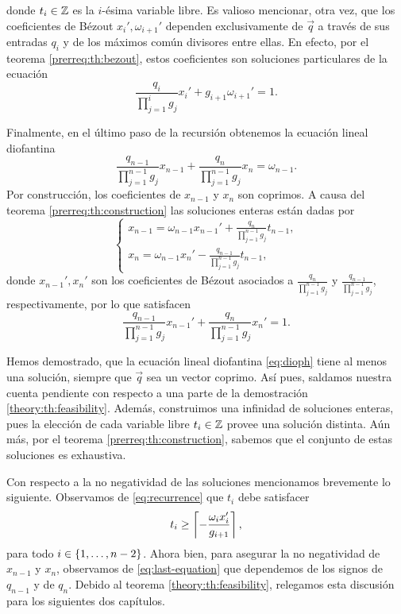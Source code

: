 donde $t_i \in \mathbb{Z}$ es la $i$-ésima variable libre. Es valioso mencionar, otra vez, que los
coeficientes de Bézout $x_i', \omega_{i+1}'$ dependen exclusivamente de $\vec{q}$ a través de sus
entradas $q_i$ y de los máximos común divisores entre ellas. En efecto, por el teorema
\ref{prerreq:th:bezout}, estos coeficientes son soluciones particulares de la ecuación
\begin{equation}
	\label{dummy:eq:bez-eq}
	\frac{q_i}{\prod_{j=1}^{i}g_j}x_i' + g_{i+1}\omega_{i+1}' = 1.
\end{equation}

Finalmente, en el último paso de la recursión obtenemos la ecuación lineal diofantina
\begin{equation}
	\label{eq:last-equation}
	\frac{q_{n-1}}{\prod_{j=1}^{n-1}g_j}x_{n-1} +
	\frac{q_{n}}{\prod_{j=1}^{n-1}g_j}x_n
	= \omega_{n-1}.
\end{equation}
Por construcción, los coeficientes de $x_{n - 1}$ y $x_n$ son coprimos. A causa del teorema
\ref{prerreq:th:construction} las soluciones enteras están dadas por
\begin{equation}
	\label{eq:last-solution}
	\begin{cases}
		x_{n-1} = \omega_{n-1}x_{n-1}' + \frac{q_n}{\prod_{j=1}^{n-1}g_j}t_{n-1}, \\
		x_n = \omega_{n-1}x_n' - \frac{q_{n-1}}{\prod_{j=1}^{n-1}g_j}t_{n-1},
	\end{cases}
\end{equation}
donde $x_{n-1}', x_n'$ son los coeficientes de Bézout asociados a
$\frac{q_n}{\prod_{j=1}^{n-1}g_j}$ y $\frac{q_{n-1}}{\prod_{j=1}^{n-1}g_j}$,
respectivamente, por lo que satisfacen
\begin{equation}
	\label{eq:last-equation-bez}
	\frac{q_{n-1}}{\prod_{j=1}^{n-1}g_j}x_{n-1}' +
	\frac{q_{n}}{\prod_{j=1}^{n-1}g_j}x_n'
	= 1.
\end{equation}

Hemos demostrado, que la ecuación lineal diofantina \eqref{eq:dioph} tiene al menos una solución,
siempre que $\vec{q}$ sea un vector coprimo. Así pues, saldamos nuestra
cuenta pendiente con respecto a una parte de la demostración \ref{theory:th:feasibility}.
Además, construimos una infinidad de soluciones enteras, pues la elección de
cada variable libre $t_i \in \mathbb{Z}$ provee una solución distinta. Aún más, por el teorema
\ref{prerreq:th:construction}, sabemos que el conjunto de estas soluciones es exhaustiva.

Con respecto a la no negatividad de las soluciones mencionamos brevemente lo siguiente.
Observamos de \eqref{eq:recurrence} que $t_i$ debe satisfacer
\begin{equation}
	\label{eq:param-lb}
	t_i \geq \left\lceil -\frac{\omega_ix_i'}{g_{i + 1}} \right\rceil,
\end{equation}
para todo $i \in \lbrace 1, \ldots, n - 2 \rbrace$. Ahora bien, para asegurar la no negatividad de
$x_{n-1}$ y $x_n$, observamos de \eqref{eq:last-equation} que dependemos de los signos de $q_{n-1}$
y de $q_n$. Debido al teorema \ref{theory:th:feasibility}, relegamos esta discusión para los
siguientes dos capítulos.

